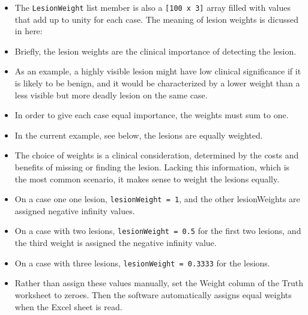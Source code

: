 \documentclass[]{book}
\providecommand{\tightlist}{%
  \setlength{\itemsep}{0pt}\setlength{\parskip}{0pt}}
\begin{document}
\begin{itemize}
\tightlist
\item
  The \texttt{LesionWeight} list member is also a \texttt{{[}100\ x\ 3{]}} array filled with values that add up to unity for each case. The meaning of lesion weights is dicussed in here: \citep{RN1385, RN1966, RN2680}
\item
  Briefly, the lesion weights are the clinical importance of detecting the lesion.
\item
  As an example, a highly visible lesion might have low clinical significance if it is likely to be benign, and it would be characterized by a lower weight than a less visible but more deadly lesion on the same case.
\item
  In order to give each case equal importance, the weights must sum to one.
\item
  In the current example, see below, the lesions are equally weighted.
\item
  The choice of weights is a clinical consideration, determined by the costs and benefits of missing or finding the lesion. Lacking this information, which is the most common scenario, it makes sense to weight the lesions equally.
\item
  On a case one one lesion, \texttt{lesionWeight\ =\ 1}, and the other lesionWeights are assigned negative infinity values.
\item
  On a case with two lesions, \texttt{lesionWeight\ =\ 0.5} for the first two lesions, and the third weight is assigned the negative infinity value.
\item
  On a case with three lesions, \texttt{lesionWeight\ =\ 0.3333} for the lesions.
\item
  Rather than assign these values manually, set the Weight column of the Truth worksheet to zeroes. Then the software automatically assigns equal weights when the Excel sheet is read.
\end{itemize}
\end{document}
